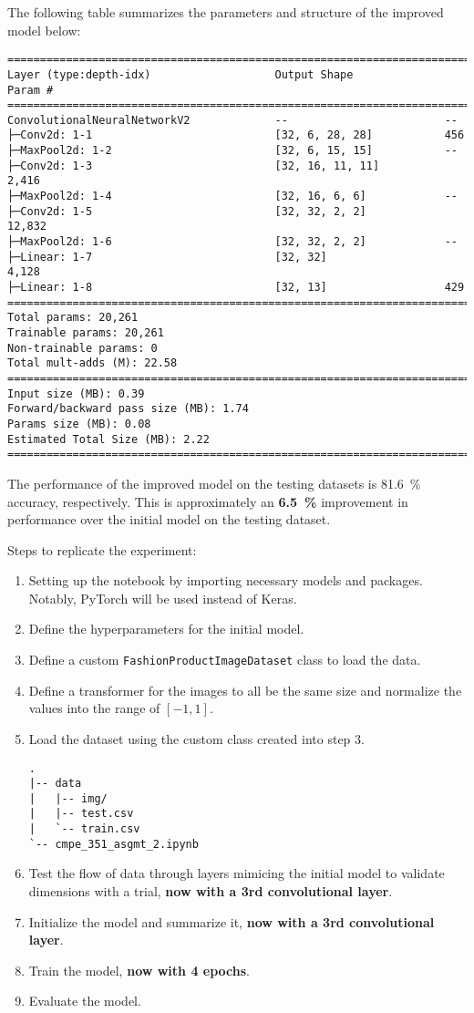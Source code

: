 \documentclass[
  coursecode={CMPE 351},
  assignmentname={Assignment 2},
  studentnumber=20053722,
  name={Bryan Hoang (16bch1)},
  draft,
  date=2020-03-07,
]{
  ltxanswer%
}
\begin{document}
  The following table summarizes the parameters and structure of the improved model below:
  \begin{verbatim}
===============================================================================
Layer (type:depth-idx)                   Output Shape              Param #
===============================================================================
ConvolutionalNeuralNetworkV2             --                        --
├─Conv2d: 1-1                            [32, 6, 28, 28]           456
├─MaxPool2d: 1-2                         [32, 6, 15, 15]           --
├─Conv2d: 1-3                            [32, 16, 11, 11]          2,416
├─MaxPool2d: 1-4                         [32, 16, 6, 6]            --
├─Conv2d: 1-5                            [32, 32, 2, 2]            12,832
├─MaxPool2d: 1-6                         [32, 32, 2, 2]            --
├─Linear: 1-7                            [32, 32]                  4,128
├─Linear: 1-8                            [32, 13]                  429
===============================================================================
Total params: 20,261
Trainable params: 20,261
Non-trainable params: 0
Total mult-adds (M): 22.58
===============================================================================
Input size (MB): 0.39
Forward/backward pass size (MB): 1.74
Params size (MB): 0.08
Estimated Total Size (MB): 2.22
===============================================================================
  \end{verbatim}

  The performance of the improved model on the testing datasets is \qty{81.6}{\percent} accuracy, respectively. This is approximately an \textbf{\qty{6.5}{\percent}} improvement in performance over the initial model on the testing dataset.

  Steps to replicate the experiment:
  \begin{enumerate}
    \item Setting up the notebook by importing necessary models and packages. Notably, PyTorch will be used instead of Keras.
    \item Define the hyperparameters for the initial model.
    \item Define a custom \texttt{FashionProductImageDataset} class to load the data.
    \item Define a transformer for the images to all be the same size and normalize the values into the range of \([-1, 1]\).
    \item Load the dataset using the custom class created into step 3.
          \begin{verbatim}
.
|-- data
|   |-- img/
|   |-- test.csv
|   `-- train.csv
`-- cmpe_351_asgmt_2.ipynb
    \end{verbatim}
    \item Test the flow of data through layers mimicing the initial model to validate dimensions with a trial, \textbf{now with a 3rd convolutional layer}.
    \item Initialize the model and summarize it, \textbf{now with a 3rd convolutional layer}.
    \item Train the model, \textbf{now with 4 epochs}.
    \item Evaluate the model.
  \end{enumerate}
\end{document}
